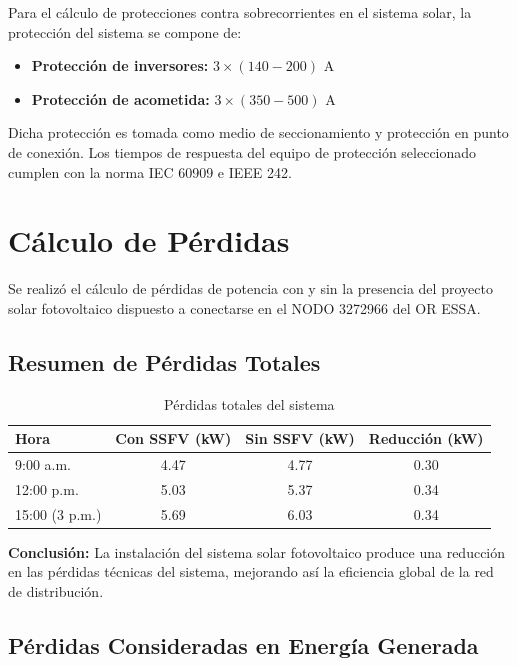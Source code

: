 Para el cálculo de protecciones contra sobrecorrientes en el sistema solar, la protección del sistema se compone de:

\begin{itemize}
    \item \textbf{Protección de inversores:} $3 \times (140-200)$ A
    \item \textbf{Protección de acometida:} $3 \times (350-500)$ A
\end{itemize}

Dicha protección es tomada como medio de seccionamiento y protección en punto de conexión. Los tiempos de respuesta del equipo de protección seleccionado cumplen con la norma IEC 60909 e IEEE 242.

\section{Cálculo de Pérdidas}

Se realizó el cálculo de pérdidas de potencia con y sin la presencia del proyecto solar fotovoltaico dispuesto a conectarse en el NODO 3272966 del OR ESSA.

\subsection{Resumen de Pérdidas Totales}

\begin{table}[H]
    \centering
    \caption{Pérdidas totales del sistema}
    \begin{tabular}{lccc}
    \toprule
    \textbf{Hora} & \textbf{Con SSFV (kW)} & \textbf{Sin SSFV (kW)} & \textbf{Reducción (kW)} \\
    \midrule
    9:00 a.m. & 4.47 & 4.77 & 0.30 \\
    12:00 p.m. & 5.03 & 5.37 & 0.34 \\
    15:00 (3 p.m.) & 5.69 & 6.03 & 0.34 \\
    \bottomrule
    \end{tabular}
\end{table}

\textbf{Conclusión:} La instalación del sistema solar fotovoltaico produce una reducción en las pérdidas técnicas del sistema, mejorando así la eficiencia global de la red de distribución.

\subsection{Pérdidas Consideradas en Energía Generada}

